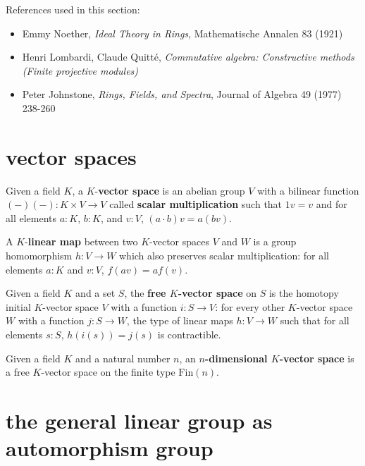 References used in this section: 
\begin{itemize}
\item Emmy Noether, \textit{Ideal Theory in Rings}, Mathematische Annalen 83 (1921)
\item Henri Lombardi, Claude Quitté, \textit{Commutative algebra: Constructive methods (Finite projective modules)}
\item Peter Johnstone, \textit{Rings, Fields, and Spectra}, Journal of Algebra 49 (1977) 238-260
\end{itemize}

\section{vector spaces}

\begin{definition}
Given a field $K$, a $K$-\textbf{vector space} is an abelian group $V$ with a bilinear function $(-)(-):K \times V \to V$ called \textbf{scalar multiplication} such that $1 v = v$ and for all elements $a:K$, $b:K$, and $v:V$, $(a \cdot b) v = a (b v)$. 
\end{definition}

\begin{definition}
A $K$-\textbf{linear map} between two $K$-vector spaces $V$ and $W$ is a group homomorphism $h:V \to W$ which also preserves scalar multiplication: for all elements $a:K$ and $v:V$, $f(a v) = a f(v)$. 
\end{definition}

\begin{definition}
Given a field $K$ and a set $S$, the \textbf{free $K$-vector space} on $S$ is the homotopy initial $K$-vector space $V$ with a function $i:S \to V$: for every other $K$-vector space $W$ with a function $j:S \to W$, the type of linear maps $h:V \to W$ such that for all elements $s:S$, $h(i(s)) = j(s)$ is contractible. 
\end{definition}

\begin{definition}
Given a field $K$ and a natural number $n$, an \textbf{$n$-dimensional $K$-vector space} is a free $K$-vector space on the finite type $\mathrm{Fin}(n)$. 
\end{definition}

\section{the general linear group as automorphism group}
